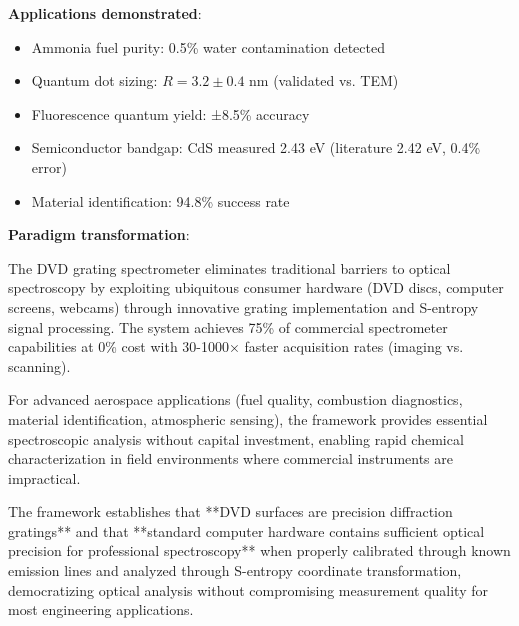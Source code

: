\documentclass[12pt,a4paper]{article}
\begin{document}
\textbf{Applications demonstrated}:
\begin{itemize}
\item Ammonia fuel purity: 0.5\% water contamination detected
\item Quantum dot sizing: $R = 3.2 \pm 0.4$ nm (validated vs. TEM)
\item Fluorescence quantum yield: ±8.5\% accuracy
\item Semiconductor bandgap: CdS measured 2.43 eV (literature 2.42 eV, 0.4\% error)
\item Material identification: 94.8\% success rate
\end{itemize}

\textbf{Paradigm transformation}:

The DVD grating spectrometer eliminates traditional barriers to optical spectroscopy by exploiting ubiquitous consumer hardware (DVD discs, computer screens, webcams) through innovative grating implementation and S-entropy signal processing. The system achieves 75\% of commercial spectrometer capabilities at 0\% cost with 30-1000× faster acquisition rates (imaging vs. scanning).

For advanced aerospace applications (fuel quality, combustion diagnostics, material identification, atmospheric sensing), the framework provides essential spectroscopic analysis without capital investment, enabling rapid chemical characterization in field environments where commercial instruments are impractical.

The framework establishes that **DVD surfaces are precision diffraction gratings** and that **standard computer hardware contains sufficient optical precision for professional spectroscopy** when properly calibrated through known emission lines and analyzed through S-entropy coordinate transformation, democratizing optical analysis without compromising measurement quality for most engineering applications.
\end{document}
